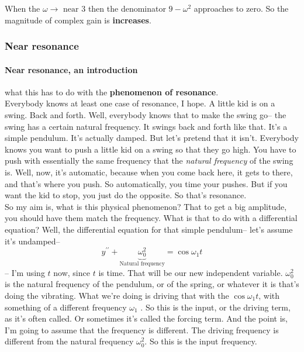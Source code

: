 When the $\omega \to \text{ near }3$ then
the denominator $9 - \omega ^2$ approaches to zero. So the magnitude of
complex gain is \textbf{increases}. 
\clearpage
\subsubsection{Near resonance}

\paragraph{Near resonance, an introduction}
what this has to do with the \textbf{phenomenon of resonance}.\\

Everybody knows at least one case of resonance, I hope.
A little kid is on a swing.
Back and forth.
Well, everybody knows that to make the swing go--
the swing has a certain natural frequency.
It swings back and forth like that.
It's a simple pendulum. It's actually damped.
But let's pretend that it isn't.
Everybody knows you want to push a little kid on a swing
so that they go high.
You have to push with essentially the same frequency
that the \textit{natural frequency} of the swing is.
Well, now, it's automatic, because when
you come back here, it gets to there,
and that's where you push.
So automatically, you time your pushes.
But if you want the kid to stop, you just do the opposite.
So that's resonance. \\

So my aim is, what is this physical phenomenon?
That to get a big amplitude, you should have them match the frequency.
What is that to do with a differential equation?
Well, the differential equation for that simple pendulum--
let's assume it's undamped--
\begin{equation*}
  y^{\prime \prime} + \underbrace{\omega _0 ^2}_{\text{Natural frequency}} = \cos \omega _1 t
\end{equation*}
-- I'm using $t$ now, since $t$ is time.
That will be our new independent variable.
$\omega _0 ^2$ is the natural frequency of the pendulum, or of the spring,
or whatever it is that's doing the vibrating.
What we're doing is driving that with the $\cos \omega _1 t$,
with something of a different frequency $\omega _1$ .
So this is the input, or the driving term,
as it's often called. Or sometimes it's called the forcing term.
And the point is, I'm going to assume that the frequency is
different.
The driving frequency is different from the natural frequency $\omega _0 ^2$.
So this is the input frequency.\\


